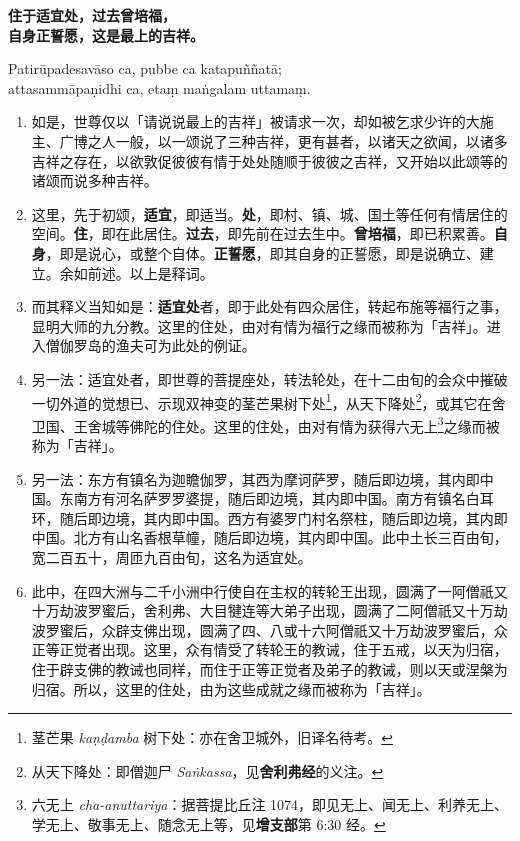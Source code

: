 \textbf{住于适宜处，过去曾培福，\\}
\textbf{自身正誓愿，这是最上的吉祥。}

Patirūpadesavāso ca, pubbe ca katapuññatā;\\
attasammāpaṇidhi ca, etaṃ maṅgalam uttamaṃ. %

\begin{enumerate}\item 如是，世尊仅以「请说说最上的吉祥」被请求一次，却如被乞求少许的大施主、广博之人一般，以一颂说了三种吉祥，更有甚者，以诸天之欲闻，以诸多吉祥之存在，以欲敦促彼彼有情于处处随顺于彼彼之吉祥，又开始以此颂等的诸颂而说多种吉祥。
\item 这里，先于初颂，\textbf{适宜}，即适当。\textbf{处}，即村、镇、城、国土等任何有情居住的空间。\textbf{住}，即在此居住。\textbf{过去}，即先前在过去生中。\textbf{曾培福}，即已积累善。\textbf{自身}，即是说心，或整个自体。\textbf{正誓愿}，即其自身的正誓愿，即是说确立、建立。余如前述。以上是释词。
\item 而其释义当知如是：\textbf{适宜处}者，即于此处有四众居住，转起布施等福行之事，显明大师的九分教。这里的住处，由对有情为福行之缘而被称为「吉祥」。进入僧伽罗岛的渔夫可为此处的例证。
\item 另一法：适宜处者，即世尊的菩提座处，转法轮处，在十二由旬的会众中摧破一切外道的觉想已、示现双神变的茎芒果树下处\footnote{茎芒果 \textit{kaṇḍamba} 树下处：亦在舍卫城外，旧译名待考。}，从天下降处\footnote{从天下降处：即僧迦尸 \textit{Saṅkassa}，见\textbf{舍利弗经}的义注。}，或其它在舍卫国、王舍城等佛陀的住处。这里的住处，由对有情为获得六无上\footnote{六无上 \textit{cha-anuttariya}：据菩提比丘注 1074，即见无上、闻无上、利养无上、学无上、敬事无上、随念无上等，见\textbf{增支部}第 6:30 经。}之缘而被称为「吉祥」。
\item 另一法：东方有镇名为迦瞻伽罗，其西为摩诃萨罗，随后即边境，其内即中国。东南方有河名萨罗罗婆提，随后即边境，其内即中国。南方有镇名白耳环，随后即边境，其内即中国。西方有婆罗门村名祭柱，随后即边境，其内即中国。北方有山名香根草幢，随后即边境，其内即中国。此中土长三百由旬，宽二百五十，周匝九百由旬，这名为适宜处。
\item 此中，在四大洲与二千小洲中行使自在主权的转轮王出现，圆满了一阿僧祇又十万劫波罗蜜后，舍利弗、大目犍连等大弟子出现，圆满了二阿僧祇又十万劫波罗蜜后，众辟支佛出现，圆满了四、八或十六阿僧祇又十万劫波罗蜜后，众正等正觉者出现。这里，众有情受了转轮王的教诫，住于五戒，以天为归宿，住于辟支佛的教诫也同样，而住于正等正觉者及弟子的教诫，则以天或涅槃为归宿。所以，这里的住处，由为这些成就之缘而被称为「吉祥」。

\end{enumerate}
